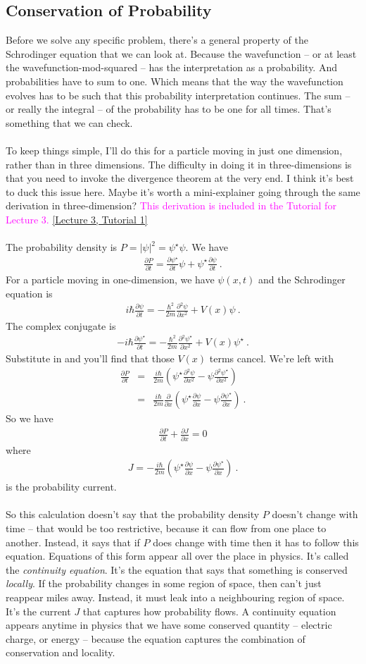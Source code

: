 \documentclass[12pt]{article}
\def\be{\begin{eqnarray}}
\def\ee{\end{eqnarray}}
\newcommand{\nn}{\nonumber}
\newcommand\para{\paragraph{}}
\newcommand{\ppp}[2]{\frac{\partial {#1}}{\partial {#2}}}
\newcommand{\alyssa}{\textcolor{magenta}}
\begin{document}
\subsection{Conservation of Probability}

Before we solve any specific problem, there's a general property of the Schrodinger equation that we can look at. Because the wavefunction -- or at least the wavefunction-mod-squared -- has the interpretation as a probability. And probabilities have to sum to one. Which means that the way the wavefunction evolves has to be such that this probability interpretation continues. The sum -- or really the integral -- of the probability has to be one for all times. That's something that we can check. 

\para
To keep things simple, I'll do this for a particle moving in just one dimension, rather than in three dimensions. {\color{blue} The difficulty in doing it in three-dimensions is that you need to invoke the divergence theorem at the very end. I think it's best to duck this issue here. Maybe it's worth a mini-explainer going through the same derivation in three-dimension?} \alyssa{This derivation is included in the Tutorial for Lecture 3.} \href{https://drive.google.com/file/d/12JSixdQ0R_mRoL3O6Sr0HWOza6faMNb5/view?usp=drive_link}{[Lecture 3, Tutorial 1]}

\para
{\color{olive} The probability density is $P=|\psi|^2 = \psi^\star\psi$. We have
%
\be \ppp{P}{t} = \ppp{\psi^\star}{t}\psi + \psi^\star\ppp{\psi}{t}\ .\nn\ee
%
For a particle moving in one-dimension, we have $\psi(x,t)$ and the Schrodinger equation is
%
\be i\hbar\ppp{\psi}{t} = -\frac{\hbar^2}{2m} \ppp{^2\psi}{x^2} + V(x)\psi\ .\ee
%
The complex conjugate is
%
\be -i\hbar\ppp{\psi^\star}{t} = -\frac{\hbar^2}{2m} \ppp{^2\psi^\star}{x^2} + V(x)\psi^\star\ .\ee}
%
Substitute in and you'll find that those $V(x)$ terms cancel. We're left with
%
{\color{olive} 
\be \ppp{P}{t} &=& \frac{i\hbar}{2m} \left(\psi^\star \ppp{^2\psi}{x^2} - \psi \ppp{^2\psi^\star}{x^2}\right) 
\nn\\ &=& \frac{i\hbar}{2m} \ppp{}{x}\left(\psi^\star \ppp{\psi}{x}- \psi \ppp{\psi^\star}{x}\right)
\ .\ee
%
So we have
%
\be \ppp{P}{t} + \ppp{J}{x} = 0\nn\ee
%
where 
%
\be J = -\frac{i\hbar}{2m} \left(\psi^\star \ppp{\psi}{x}- \psi \ppp{\psi^\star}{x}\right)\ .\ee
%
is the probability current.}

\para
So this calculation doesn't say that the probability density $P$ doesn't change with time -- that would be too restrictive, because it can flow from one place to another. Instead, it says that if $P$ does change with time then it has to follow this equation. Equations of this form appear all over the place in physics. It's called the {\it continuity equation}. It's the equation that says that something is conserved {\it locally}. If the probability changes in some region of space, then can't just reappear miles away. Instead, it must leak into a neighbouring region of space. It's the current $J$ that captures how probability flows. A continuity equation appears anytime in physics that we have some conserved quantity -- electric charge, or energy -- because the equation captures the combination of conservation and locality. 
\end{document}
